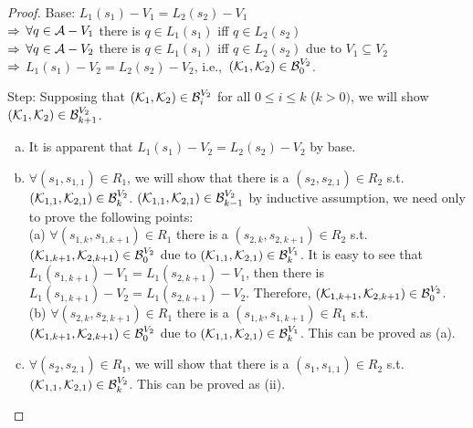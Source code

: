 \documentclass{article}
\begin{document}
\begin{proof}
Base: $L_1(s_1) - V_1 = L_2(s_2) - V_1$\\
$\Rightarrow$ $\forall q \in {\cal A} - V_1$ there is $q \in L_1(s_1)$ iff $q \in L_2(s_2)$\\
$\Rightarrow$ $\forall q \in {\cal A} - V_2$ there is $q \in L_1(s_1)$ iff $q \in L_2(s_2)$ due to $V_1 \subseteq V_2$\\
$\Rightarrow$ $L_1(s_1) - V_2 = L_2(s_2) - V_2$, i.e.,\ $({\cal K}_1, {\cal K}_2) \in {\cal B}_0^{V_2}$.

Step: Supposing that $({\cal K}_1, {\cal K}_2) \in {\cal B}_i^{V_2}$ for all $0 \leq i \leq k$ ($k > 0)$, we will show $({\cal K}_1, {\cal K}_2) \in {\cal B}_{k+1}^{V_2}$.
\begin{enumerate} [(a)]
  \item It is apparent that $L_1(s_1) - V_2 = L_2(s_2) - V_2$ by base.
  \item $\forall (s_1, s_{1,1}) \in R_1$, we will show that there is a $(s_2, s_{2, 1}) \in R_2$ s.t.\ $({\cal K}_{1,1}, {\cal K}_{2,1})\in {\cal B}_k^{V_2}$. $({\cal K}_{1,1}, {\cal K}_{2,1})\in {\cal B}_{k-1}^{V_2}$ by inductive assumption, we need only to prove the following points:\\
      (a) $\forall (s_{1, k}, s_{1, k+1}) \in R_1$ there is a $(s_{2, k}, s_{2, k+1})\in R_2$ s.t.\ $({\cal K}_{1,k+1}, {\cal K}_{2,k+1})\in {\cal B}_0^{V_2}$ due to $({\cal K}_{1,1}, {\cal K}_{2,1})\in {\cal B}_{k}^{V_1}$. It is easy to see that $L_1(s_{1, k+1}) - V_1 = L_1(s_{2, k+1}) - V_1$, then there is $L_1(s_{1, k+1})- V_2 = L_1(s_{2, k+1}) - V_2$. Therefore, $({\cal K}_{1,k+1}, {\cal K}_{2,k+1})\in {\cal B}_0^{V_2}$.\\
      (b) $\forall (s_{2, k}, s_{2, k+1}) \in R_1$ there is a $(s_{1, k}, s_{1, k+1}) \in R_1$ s.t.\ $({\cal K}_{1,k+1}, {\cal K}_{2,k+1})\in {\cal B}_0^{V_2}$ due to $({\cal K}_{1,1}, {\cal K}_{2,1})\in {\cal B}_{k}^{V_1}$. This can be proved as (a).
  \item $\forall (s_2, s_{2,1}) \in R_1$, we will show that there is a $(s_1, s_{1, 1}) \in R_2$ s.t.\ $({\cal K}_{1,1}, {\cal K}_{2,1})\in {\cal B}_k^{V_2}$. This can be proved as (ii).
\end{enumerate}
\end{proof}
\end{document}
